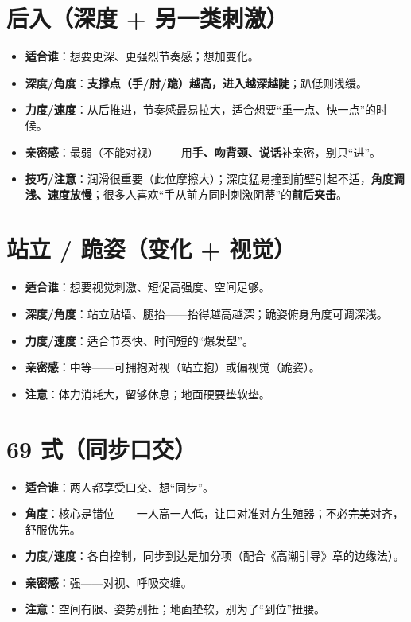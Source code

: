 \section{后入（深度 + 另一类刺激）}
\begin{itemize}[leftmargin=2em,itemsep=0.3em]
  \item \textbf{适合谁}：想要更深、更强烈节奏感；想加变化。
  \item \textbf{深度/角度}：\textbf{支撑点（手/肘/跪）越高，进入越深越陡}；趴低则浅缓。
  \item \textbf{力度/速度}：从后推进，节奏感最易拉大，适合想要“重一点、快一点”的时候。
  \item \textbf{亲密感}：最弱（不能对视）——用\textbf{手、吻背颈、说话}补亲密，别只“进”。
  \item \textbf{技巧/注意}：润滑很重要（此位摩擦大）；深度猛易撞到前壁引起不适，\textbf{角度调浅、速度放慢}；很多人喜欢“手从前方同时刺激阴蒂”的\textbf{前后夹击}。
\end{itemize}

\section{站立 / 跪姿（变化 + 视觉）}
\begin{itemize}[leftmargin=2em,itemsep=0.3em]
  \item \textbf{适合谁}：想要视觉刺激、短促高强度、空间足够。
  \item \textbf{深度/角度}：站立贴墙、腿抬——抬得越高越深；跪姿俯身角度可调深浅。
  \item \textbf{力度/速度}：适合节奏快、时间短的“爆发型”。
  \item \textbf{亲密感}：中等——可拥抱对视（站立抱）或偏视觉（跪姿）。
  \item \textbf{注意}：体力消耗大，留够休息；地面硬要垫软垫。
\end{itemize}

\section{69 式（同步口交）}
\begin{itemize}[leftmargin=2em,itemsep=0.3em]
  \item \textbf{适合谁}：两人都享受口交、想“同步”。
  \item \textbf{角度}：核心是错位——一人高一人低，让口对准对方生殖器；不必完美对齐，舒服优先。
  \item \textbf{力度/速度}：各自控制，同步到达是加分项（配合《高潮引导》章的边缘法）。
  \item \textbf{亲密感}：强——对视、呼吸交缠。
  \item \textbf{注意}：空间有限、姿势别扭；地面垫软，别为了“到位”扭腰。
\end{itemize}

